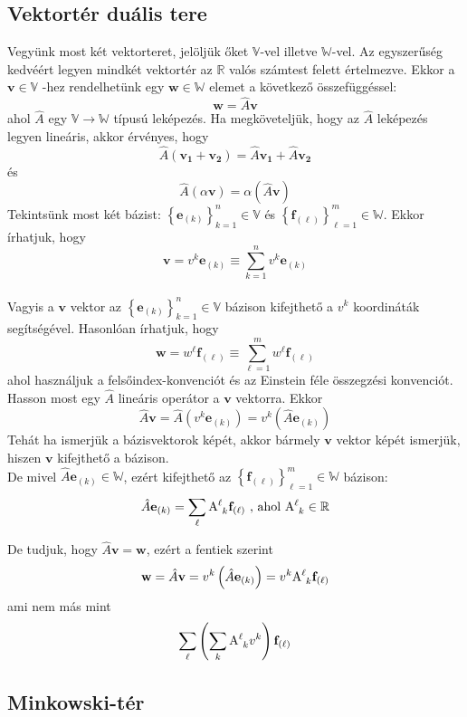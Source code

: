 \subsection{Vektortér duális tere}
Vegyünk most két vektorteret, jelöljük őket $\mathbb{V}$-vel illetve $\mathbb{W}$-vel. Az egyszerűség kedvéért
legyen mindkét vektortér az $\mathbb{R}$ valós számtest felett értelmezve. Ekkor a $\mathbf{v} \in \mathbb{V}$ -hez rendelhetünk
egy $\mathbf{w} \in \mathbb{W}$ elemet a következő összefüggéssel:
\[ \mathbf{w} = \hat{A}\mathbf{v} \]
ahol $\hat{A}$ egy $\mathbb{V} \rightarrow \mathbb{W}$ típusú leképezés.
Ha megköveteljük, hogy az $\hat{A}$ leképezés legyen lineáris, akkor érvényes, hogy
\[ \hat{A}(\mathbf{v_1} + \mathbf{v_2}) = \hat{A}\mathbf{v_1} + \hat{A}\mathbf{v_2} \]
és
\[ \hat{A}(\alpha\mathbf{v}) = \alpha(\hat{A}\mathbf{v}) \]
Tekintsünk most két bázist: $\left \{ \mathbf{e}_{(k)} \right \} _{k=1}^n \in \mathbb{V}$ és $\left \{ \mathbf{f}_{(\ell)} \right \} _{\ell=1}^m \in \mathbb{W}$.
Ekkor írhatjuk, hogy
\[ \mathbf{v} = v^k\mathbf{e}_{(k)} \equiv \sum\limits_{k=1}^n v^k\mathbf{e}_{(k)}  \]
\\ Vagyis a $\mathbf{v}$ vektor az $\left \{ \mathbf{e}_{(k)} \right \} _{k=1}^n \in \mathbb{V}$ bázison kifejthető a
$v^k$ koordináták segítségével. Hasonlóan írhatjuk, hogy
\[ \mathbf{w} = w^\ell \mathbf{f}_{(\ell)} \equiv \sum\limits_{\ell=1}^m w^\ell \mathbf{f}_{(\ell)}  \]
ahol használjuk a felsőindex-konvenciót és az Einstein féle összegzési konvenciót.
Hasson most egy $\hat{A}$ lineáris operátor a $\mathbf{v}$ vektorra.
Ekkor
\[ \hat{A}\mathbf{v} = \hat{A} \left( v^k\mathbf{e}_{(k)} \right) = v^k\left( \hat{A}\mathbf{e}_{(k)} \right) \]
Tehát ha ismerjük a bázisvektorok képét, akkor bármely $\mathbf{v}$ vektor képét ismerjük, hiszen $\mathbf{v}$ kifejthető
a bázison.
\\ De mivel $\hat{A}\mathbf{e}_{(k)} \in \mathbb{W}$, ezért kifejthető az $\left \{ \mathbf{f}_{(\ell)} \right \} _{\ell=1}^m \in \mathbb{W}$ bázison:
\[ \hat{A}\mathbf{e}_{(k)} = \sum\limits_{\ell} \mathrm{A}_{~k}^{\ell} \mathbf{f}_{(\ell)} \textrm{ , ahol } \mathrm{A}_{~k}^{\ell} \in \mathbb{R} \]

De tudjuk, hogy $\hat{A}\mathbf{v} = \mathbf{w}$, ezért a fentiek szerint
\[ \mathbf{w} = \hat{A}\mathbf{v} = v^k\left( \hat{A}\mathbf{e}_{(k)} \right) = v^k \mathrm{A}_{~k}^{\ell} \mathbf{f}_{(\ell)} \]
ami nem más mint
\[ \sum\limits_{\ell} \left( \sum\limits_{k} \mathrm{A}_{~k}^{\ell} v^k \right) \mathbf{f}_{(\ell)}\]
\subsection{Minkowski-tér}
